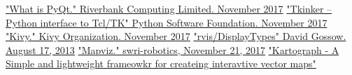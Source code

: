 \documentclass[onecolumn, draftclsnofoot, 10pt, compsoc]{IEEEtran}
\begin{document}
\begin{thebibliography}{9}
\href{https://riverbankcomputing.com/software/pyqt/intro}{"What is PyQt." Riverbank Computing Limited. November 2017}
\href{https://docs.python.org/2/library/tkinter.html}{"Tkinker -- Python interface to Tcl/TK" Python Software Foundation. November 2017}
\href{https://kivy.org/}{"Kivy." Kivy Organization. November 2017}
\href{http://wiki.ros.org/rviz/DisplayTypes}{"rvis/DisplayTypes" David Gossow. August 17, 2013}
\href{https://github.com/swri-robotics/mapviz}{"Mapviz." swri-robotics, November 21, 2017}
\href{http://kartograph.org/}{"Kartograph - A Simple and lightweight frameowkr for createing interavtive vector maps"}
\end{thebibliography}
\end{document}
